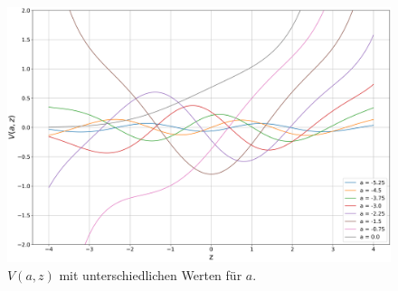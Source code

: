 \begin{figure}
    \centering
    \includegraphics[scale=0.3]{papers/parzyl/img/v_plot.png}
    \caption{$V(a,z)$ mit unterschiedlichen Werten für $a$.}
    \label{parzyl:fig:Vnz}
\end{figure}